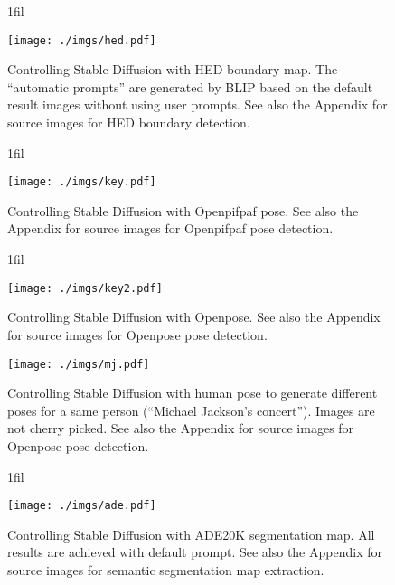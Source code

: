 \documentclass{article}
\makeatletter
\newcommand*{\centerfloat}{%
	\parindent \z@
	\leftskip \z@ \@plus 1fil \@minus \textwidth
	\rightskip\leftskip
	\parfillskip \z@skip}
\makeatother
\begin{document}
\begin{figure}
	\centerfloat
	\begin{minipage}{1.4\linewidth}
		\texttt{[image: ./imgs/hed.pdf]}
		\caption{Controlling Stable Diffusion with HED boundary map. The ``automatic prompts'' are generated by BLIP based on the default result images without using user prompts. See also the Appendix for source images for HED boundary detection.}
			\label{fig:hed} 
	\end{minipage}

\end{figure}

\begin{figure}
	\vspace{-50pt}
	\centerfloat
	\begin{minipage}{1.4\linewidth}
		\texttt{[image: ./imgs/key.pdf]}
	\vspace{-5pt}
		\caption{Controlling Stable Diffusion with Openpifpaf pose. See also the Appendix for source images for Openpifpaf pose detection.}
	\label{fig:key} 	\end{minipage}

\end{figure}

\begin{figure}
	\vspace{-5pt}
	\centerfloat
	\begin{minipage}{1.4\linewidth}
		\texttt{[image: ./imgs/key2.pdf]}
		\vspace{-5pt}
		\caption{Controlling Stable Diffusion with Openpose. See also the Appendix for source images for Openpose pose detection.}
	\label{fig:key2} 	\end{minipage}

\end{figure}

\begin{figure}
	\centering
	\texttt{[image: ./imgs/mj.pdf]}
	\caption{Controlling Stable Diffusion with human pose to generate different poses for a same person (``Michael Jackson's concert''). Images are not cherry picked. See also the Appendix for source images for Openpose pose detection.}
	\label{fig:mj} 
\end{figure}

\begin{figure}
	\centerfloat
	\begin{minipage}{1.4\linewidth}
		\texttt{[image: ./imgs/ade.pdf]}
		\caption{Controlling Stable Diffusion with ADE20K \cite{8100027} segmentation map. All results are achieved with default prompt. See also the Appendix for source images for semantic segmentation map extraction.}
	\label{fig:ade} 	\end{minipage}

\end{figure}
\end{document}
